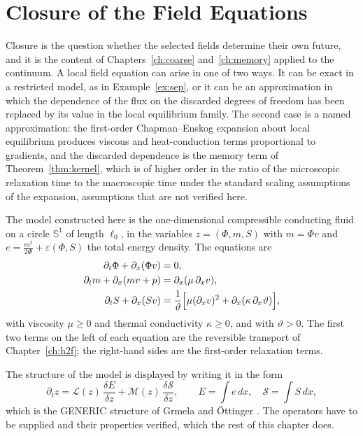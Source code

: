 \documentclass[11pt,oneside]{book}
\theoremstyle{definition}
\theoremstyle{remark}
\newcommand{\mathscr}[1]{\mathcal{#1}}
\begin{document}
\chapter{Closure of the Field Equations}\label{ch:closure}

Closure is the question whether the selected fields determine their own future, and it is the content of Chapters~\ref{ch:coarse} and~\ref{ch:memory} applied to the continuum. A local field equation can arise in one of two ways. It can be exact in a restricted model, as in Example~\ref{ex:sep}, or it can be an approximation in which the dependence of the flux on the discarded degrees of freedom has been replaced by its value in the local equilibrium family. The second case is a named approximation: the first-order Chapman--Enskog expansion about local equilibrium produces viscous and heat-conduction terms proportional to gradients, and the discarded dependence is the memory term of Theorem~\ref{thm:kernel}, which is of higher order in the ratio of the microscopic relaxation time to the macroscopic time under the standard scaling assumptions of the expansion, assumptions that are not verified here.

The model constructed here is the one-dimensional compressible conducting fluid on a circle $\mathbb S^1$ of length $\ell_0$, in the variables $z=(\Phi,m,S)$ with $m=\Phi v$ and $e=\tfrac{m^2}{2\Phi}+\varepsilon(\Phi,S)$ the total energy density. The equations are
\begin{align}
\partial_t\Phi+\partial_x(\Phi v)&=0,\label{eq:mass}\\
\partial_t m+\partial_x(mv+p)&=\partial_x(\mu\,\partial_xv),\label{eq:momentum}\\
\partial_tS+\partial_x(Sv)&=\frac1\vartheta\Bigl[\mu(\partial_xv)^2+\partial_x(\kappa\,\partial_x\vartheta)\Bigr],\label{eq:entropy}
\end{align}
with viscosity $\mu\geq0$ and thermal conductivity $\kappa\geq0$, and with $\vartheta>0$. The first two terms on the left of each equation are the reversible transport of Chapter~\ref{ch:h2f}; the right-hand sides are the first-order relaxation terms.

The structure of the model is displayed by writing it in the form
\begin{equation}\label{eq:generic}
\partial_tz=\mathcal L(z)\,\frac{\delta E}{\delta z}+\mathcal M(z)\,\frac{\delta\mathscr S}{\delta z},\qquad E=\int e\,dx,\quad\mathscr S=\int S\,dx,
\end{equation}
which is the GENERIC structure of Grmela and \"Ottinger \cite{grmela1997,ottinger1997}. The operators have to be supplied and their properties verified, which the rest of this chapter does.
\end{document}
